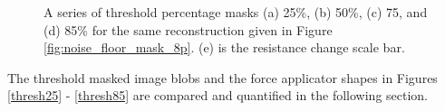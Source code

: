 \begin{figure}[H]
\begin{minipage}[t]{.08\textwidth}
        \hfill
    \end{minipage}  
\caption{A series of threshold percentage masks (a) 25\%, (b) 50\%, (c) 75, and (d) 85\% for the same reconstruction given in Figure \ref{fig:noise_floor_mask_8p}. (e) is the resistance change scale bar.}
\label{fig:thresh_masks}
\end{figure}
The threshold masked image blobs and the force applicator shapes in Figures \ref{thresh25} - \ref{thresh85} are compared and quantified in the following section.

